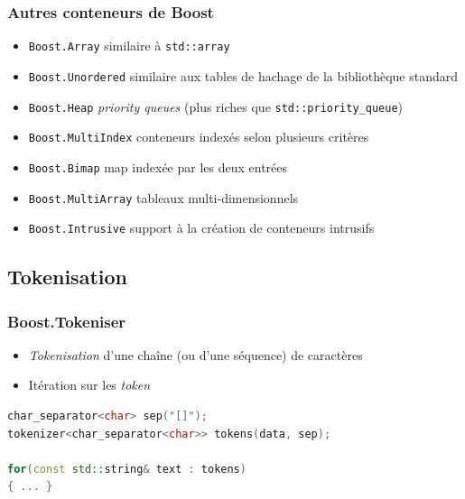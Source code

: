 \documentclass[C++.tex]{subfiles}
\begin{document}
\begin{frame}[fragile]
	\frametitle{Autres conteneurs de Boost}
	\begin{itemize}
		\item \lstinline|Boost.Array| similaire à \lstinline|std::array|
		\item \lstinline|Boost.Unordered| similaire aux tables de hachage de la bibliothèque standard


		\item \lstinline|Boost.Heap| \textit{priority queues} (plus riches que \lstinline|std::priority_queue|)
		\item \lstinline|Boost.MultiIndex| conteneurs indexés selon plusieurs critères
		\item \lstinline|Boost.Bimap| map indexée par les deux entrées
		\item \lstinline|Boost.MultiArray| tableaux multi-dimensionnels
		\item \lstinline|Boost.Intrusive| support à la création de conteneurs intrusifs

	\end{itemize}
\end{frame}

\subsection*{Tokenisation}
\begin{frame}[fragile]
	\frametitle{Boost.Tokeniser}
	\begin{itemize}
		\item \textit{Tokenisation} d'une chaîne (ou d'une séquence) de caractères
		\item Itération sur les \textit{token}
	\end{itemize}




	\begin{lstlisting}[language=C++]
char_separator<char> sep("[]");
tokenizer<char_separator<char>> tokens(data, sep);

for(const std::string& text : tokens)
{ ... }\end{lstlisting}
\end{frame}
\end{document}
